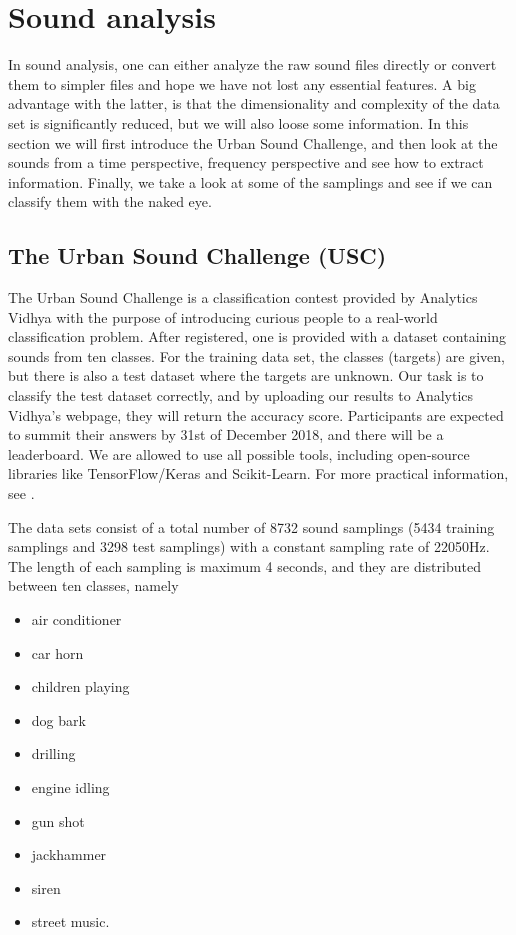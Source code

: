 \section{Sound analysis}
In sound analysis, one can either analyze the raw sound files directly or convert them to simpler files and hope we have not lost any essential features. A big advantage with the latter, is that the dimensionality and complexity of the data set is significantly reduced, but we will also loose some information. In this section we will first introduce the Urban Sound Challenge, and then look at the sounds from a time perspective, frequency perspective and see how to extract information. Finally, we take a look at some of the samplings and see if we can classify them with the naked eye.

\subsection{The Urban Sound Challenge (USC)}
The Urban Sound Challenge is a classification contest provided by Analytics Vidhya with the purpose of introducing curious people to a real-world classification problem. After registered, one is provided with a dataset containing sounds from ten classes. For the training data set, the classes (targets) are given, but there is also a test dataset where the targets are unknown. Our task is to classify the test dataset correctly, and by uploading our results to Analytics Vidhya's webpage, they will return the accuracy score. Participants are expected to summit their answers by 31st of December 2018, and there will be a leaderboard. We are allowed to use all possible tools, including open-source libraries like TensorFlow/Keras and Scikit-Learn. For more practical information, see \cite{USC}.

The data sets consist of a total number of 8732 sound samplings (5434 training samplings and 3298 test samplings) with a constant sampling rate of 22050Hz. The length of each sampling is maximum 4 seconds, and they are distributed between ten classes, namely
\begin{multicols}{2}
	\begin{itemize}
		\setlength\itemsep{0.2em}
		\item air conditioner
		\item car horn
		\item children playing
		\item dog bark
		\item drilling
	\end{itemize}
	
	\columnbreak
	
	\begin{itemize}
		\setlength\itemsep{0.2em}
		\item engine idling
		\item gun shot
		\item jackhammer
		\item siren
		\item street music.
	\end{itemize}
\end{multicols}

